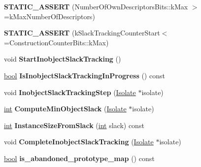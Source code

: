 \begin{DoxyCompactItemize}
{\bfseries S\+T\+A\+T\+I\+C\+\_\+\+A\+S\+S\+E\+RT} (Number\+Of\+Own\+Descriptors\+Bits\+::k\+Max $>$=k\+Max\+Number\+Of\+Descriptors)
\item 
\mbox{\label{classv8_1_1internal_1_1Map_a8faadd6a2a18f14bd93e5ff2208e11b0}} 
{\bfseries S\+T\+A\+T\+I\+C\+\_\+\+A\+S\+S\+E\+RT} (k\+Slack\+Tracking\+Counter\+Start$<$=Construction\+Counter\+Bits\+::k\+Max)
\item 
\mbox{\label{classv8_1_1internal_1_1Map_a4e0bbe0069d3f0b11495b17d1318f9e6}} 
void {\bfseries Start\+Inobject\+Slack\+Tracking} ()
\item 
\mbox{\label{classv8_1_1internal_1_1Map_a3870da191d279b0c7efe745bbaac9f30}} 
\mbox{\hyperlink{classbool}{bool}} {\bfseries Is\+Inobject\+Slack\+Tracking\+In\+Progress} () const
\item 
\mbox{\label{classv8_1_1internal_1_1Map_a98316073c0c02c31a2b103f666397bbe}} 
void {\bfseries Inobject\+Slack\+Tracking\+Step} (\mbox{\hyperlink{classv8_1_1internal_1_1Isolate}{Isolate}} $\ast$isolate)
\item 
\mbox{\label{classv8_1_1internal_1_1Map_a9a36fcd877dc95abc78f952d90d2f8fe}} 
\mbox{\hyperlink{classint}{int}} {\bfseries Compute\+Min\+Object\+Slack} (\mbox{\hyperlink{classv8_1_1internal_1_1Isolate}{Isolate}} $\ast$isolate)
\item 
\mbox{\label{classv8_1_1internal_1_1Map_a4f166249560a5e62743e7f7223fc0ede}} 
\mbox{\hyperlink{classint}{int}} {\bfseries Instance\+Size\+From\+Slack} (\mbox{\hyperlink{classint}{int}} slack) const
\item 
\mbox{\label{classv8_1_1internal_1_1Map_a912f398dd4a3c7ad9b13506a6ad3af1f}} 
void {\bfseries Complete\+Inobject\+Slack\+Tracking} (\mbox{\hyperlink{classv8_1_1internal_1_1Isolate}{Isolate}} $\ast$isolate)
\item 
\mbox{\label{classv8_1_1internal_1_1Map_af28ec2338bfd79e7f405ea7b456616da}} 
\mbox{\hyperlink{classbool}{bool}} {\bfseries is\+\_\+abandoned\+\_\+prototype\+\_\+map} () const

\end{DoxyCompactItemize}
